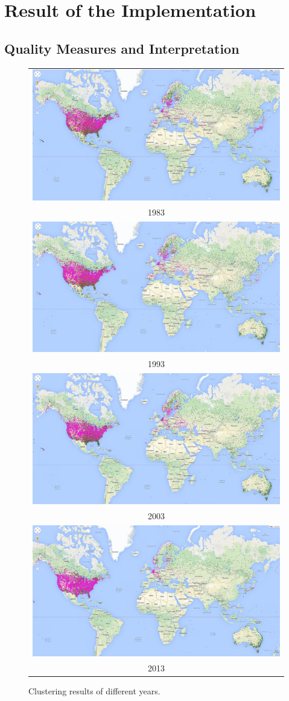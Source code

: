 \section{Result of the Implementation}
\subsection{Quality Measures and Interpretation}
\begin{figure}
    \centering
    \begin{tabular}{c}
        \includegraphics[width =.65\linewidth]{figure/1983.png}\\         1983 \\
        \includegraphics[width =.65\linewidth]{figure/1993.png} \\
        1993 \\
        \includegraphics[width =.65\linewidth]{figure/2003.png} \\         2003 \\
        \includegraphics[width =.65\linewidth]{figure/2013.png} \\
        2013\\
    \end{tabular}
    \caption{Clustering results of different years.}
    \label{fig:ClusteringFlow}
\end{figure}


